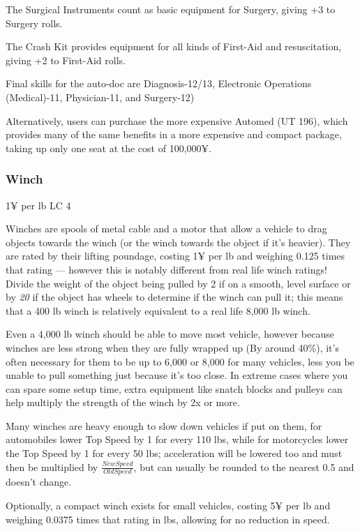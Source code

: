 \begin{multicols*}{2}
	The Surgical Instruments count as basic equipment for Surgery, giving +3 to Surgery rolls.
	
	The Crash Kit provides equipment for all kinds of First-Aid and resuscitation, giving +2 to First-Aid rolls.
	
	Final skills for the auto-doc are Diagnosis-12/13, Electronic Operations (Medical)-11, Physician-11, and Surgery-12)
	
	Alternatively, users can purchase the more expensive Automed (UT 196), which provides many of the same benefits in a more expensive and compact package, taking up only one seat at the cost of 100,000¥.
		
	\subsubsection{Winch}
	1¥ per lb LC 4
	
	Winches are spools of metal cable and a motor that allow a vehicle to drag objects towards the winch (or the winch towards the object if it's heavier). They are rated by their lifting poundage, costing 1¥ per lb and weighing 0.125 times that rating — however this is notably different from real life winch ratings! Divide the weight of the object being pulled by 2 if on a smooth, level surface or by \textit{20} if the object has wheels to determine if the winch can pull it; this means that a 400 lb winch is relatively equivalent to a real life 8,000 lb winch.
	
	Even a 4,000 lb winch should be able to move most vehicle, however because winches are less strong when they are fully wrapped up (By around 40\%), it's often necessary for them to be up to 6,000 or 8,000 for many vehicles, less you be unable to pull something just because it's too close. In extreme cases where you can spare some setup time, extra equipment like snatch blocks and pulleys can help multiply the strength of the winch by 2x or more. 
	
	Many winches are heavy enough to slow down vehicles if put on them, for automobiles lower Top Speed by 1 for every 110 lbs, while for motorcycles lower the Top Speed by 1 for every 50 lbs; acceleration will be lowered too and must then be multiplied by $\frac{New Speed}{Old Speed}$, but can usually be rounded to the nearest 0.5 and doesn't change.
	
	Optionally, a compact winch exists for small vehicles, costing 5¥ per lb and weighing 0.0375 times that rating in lbs, allowing for no reduction in speed.
	

\end{multicols*}
